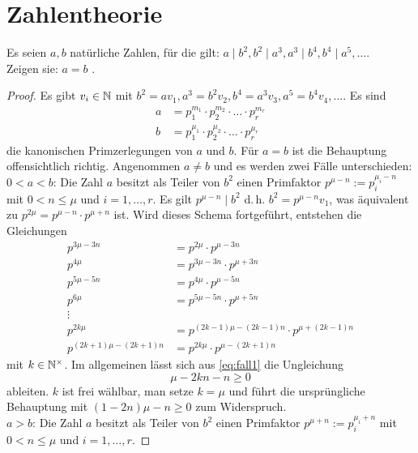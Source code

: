 \chapter{Zahlentheorie}
Es seien $a, b$ natürliche Zahlen, für die gilt:
$a \mid b^2, b^2 \mid a^3, a^3 \mid b^4, b^4 \mid a^5, \dots$.\\
Zeigen sie: $a = b$ \parencite[33]{book:zahlentheorie}.
\begin{proof}
Es gibt $v_i \in \mathbb{N}{}$ mit
$b^2 = av_1, a^3 = b^2v_2, b^4 = a^3v_3, a^5 = b^4v_4, \dotsc$.
Es sind
\begin{align*}
  a & = p_1^{m_1} \cdot p_2^{m_2} \cdot \ldots \cdot p_r^{m_r} \\
  b & = p_1^{\mu_1} \cdot p_2^{\mu_2} \cdot \ldots \cdot p_r^{\mu_r}
\end{align*}
die kanonischen Primzerlegungen von $a$ und $b$.
Für $a = b$ ist die Behauptung offensichtlich richtig.
Angenommen $a \neq b$ und es werden zwei Fälle unterschieden: \\[4pt]
$0 < a < b$: Die Zahl $a$ besitzt als Teiler von $b^2$ einen Primfaktor
$p^{\mu - n} := p_i^{\mu_i - n}$ mit $0 < n \leq \mu$ und $i = 1,\dotsc,r$.
Es gilt $p^{\mu - n} \mid b^2$
d.\,h. $b^2 = p^{\mu - n}v_1$, was äquivalent zu
$p^{2\mu} = p^{\mu - n} \cdot p^{\mu + n}$ ist.
Wird dieses Schema fortgeführt, entstehen die Gleichungen
\begin{align*}
p^{3\mu - 3n} & = p^{2\mu}      \cdot p^{\mu - 3n} \\
p^{4\mu}      & = p^{3\mu - 3n} \cdot p^{\mu + 3n} \\
p^{5\mu - 5n} & = p^{4\mu}      \cdot p^{\mu - 5n} \\
p^{6\mu}      & = p^{5\mu - 5n} \cdot p^{\mu + 5n} \\
\vdots \\
p^{2k\mu} & = p^{(2k - 1)\mu - (2k - 1)n} \cdot p^{\mu + (2k - 1)n}  \\
\label{eq:fall1} \tag{$*$}
p^{(2k + 1)\mu - (2k + 1)n} & = p^{2k\mu} \cdot p^{\mu - (2k + 1)n}
\end{align*}
mit $k \in \mathbb{N}^\times{}$. Im allgemeinen lässt sich aus \eqref{eq:fall1}
die Ungleichung
\begin{equation*}
\mu - 2kn - n \geq 0
\end{equation*}
ableiten. $k$ ist frei wählbar, man setze $k = \mu$ und führt
die ursprüngliche Behauptung mit $(1 - 2n)\mu - n \geq 0$ zum Widerspruch. \\[4pt]
$a > b$: Die Zahl $a$ besitzt als Teiler von $b^2$ einen Primfaktor
$p^{\mu + n} := p_i^{\mu_i + n}$ mit $0 < n \leq \mu$ und $i = 1,\dotsc,r$.

\end{proof}
